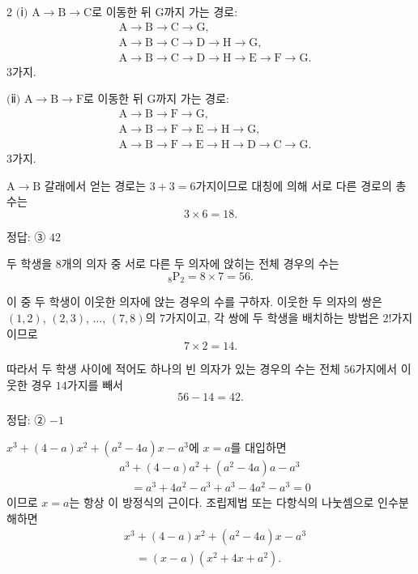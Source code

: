 \documentclass[10pt]{article}
\begin{document}
\begin{multicols}{2}
$(\!$ⅰ$)$ $\mathrm{A} \to \mathrm{B} \to \mathrm{C}$로 이동한 뒤 $\mathrm{G}$까지 가는 경로:
\begin{align*}
&\mathrm{A} \to \mathrm{B} \to \mathrm{C} \to \mathrm{G}, \\
&\mathrm{A} \to \mathrm{B} \to \mathrm{C} \to \mathrm{D} \to \mathrm{H} \to \mathrm{G}, \\
&\mathrm{A} \to \mathrm{B} \to \mathrm{C} \to \mathrm{D} \to \mathrm{H} \to \mathrm{E} \to \mathrm{F} \to \mathrm{G}.
\end{align*}
$3$가지.

$(\!$ⅱ$)$ $\mathrm{A} \to \mathrm{B} \to \mathrm{F}$로 이동한 뒤 $\mathrm{G}$까지 가는 경로:
\begin{align*}
&\mathrm{A} \to \mathrm{B} \to \mathrm{F} \to \mathrm{G}, \\
&\mathrm{A} \to \mathrm{B} \to \mathrm{F} \to \mathrm{E} \to \mathrm{H} \to \mathrm{G}, \\
&\mathrm{A} \to \mathrm{B} \to \mathrm{F} \to \mathrm{E} \to \mathrm{H} \to \mathrm{D} \to \mathrm{C} \to \mathrm{G}.
\end{align*}
$3$가지.

$\mathrm{A} \to \mathrm{B}$ 갈래에서 얻는 경로는 $3 + 3 = 6$가지이므로 대칭에 의해 서로 다른 경로의 총 수는
\[ 3 \times 6 = 18. \]

\begin{answerbox}정답: ③ $42$\end{answerbox}

두 학생을 $8$개의 의자 중 서로 다른 두 의자에 앉히는 전체 경우의 수는
\[ {}_8\mathrm{P}_2 = 8 \times 7 = 56. \]

이 중 두 학생이 이웃한 의자에 앉는 경우의 수를 구하자. 이웃한 두 의자의 쌍은 $(1,2)$, $(2,3)$, $\ldots$, $(7,8)$의 $7$가지이고, 각 쌍에 두 학생을 배치하는 방법은 $2!$가지이므로
\[ 7 \times 2 = 14. \]

따라서 두 학생 사이에 적어도 하나의 빈 의자가 있는 경우의 수는 전체 $56$가지에서 이웃한 경우 $14$가지를 빼서
\[ 56 - 14 = 42. \]

\begin{answerbox}정답: ② $-1$\end{answerbox}

$x^3 + (4-a)x^2 + (a^2-4a)x - a^3$에 $x = a$를 대입하면
\begin{align*}
&a^3 + (4-a)a^2 + (a^2 - 4a)a - a^3 \\
&\quad = a^3 + 4a^2 - a^3 + a^3 - 4a^2 - a^3 = 0
\end{align*}
이므로 $x = a$는 항상 이 방정식의 근이다. 조립제법 또는 다항식의 나눗셈으로 인수분해하면
\begin{align*}
&x^3 + (4-a)x^2 + (a^2-4a)x - a^3 \\
&\quad = (x - a)(x^2 + 4x + a^2).
\end{align*}


\end{multicols}
\end{document}
